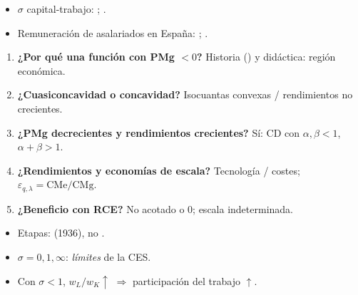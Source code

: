 \documentclass{article}
\begin{document}
\begin{columnas}
\anexorepaso
{}
\begin{itemize}
\item $\sigma$ capital-trabajo: ; .
\item Remuneración de asalariados en España: ; .
\end{itemize}
\begin{enumerate}
\item \textbf{¿Por qué una función con PMg $<0$?} Historia () y didáctica: región económica.
\item \textbf{¿Cuasiconcavidad o concavidad?} Isocuantas convexas / rendimientos no crecientes.
\item \textbf{¿PMg decrecientes y rendimientos crecientes?} Sí: CD con $\alpha,\beta<1$, $\alpha+\beta>1$.
\item \textbf{¿Rendimientos y economías de escala?} Tecnología / costes; $\varepsilon_{q,\lambda}=\mathrm{CMe}/\mathrm{CMg}$.
\item \textbf{¿Beneficio con RCE?} No acotado o 0; escala indeterminada.
\end{enumerate}
\begin{trampa}
\begin{itemize}
\item Etapas:  (1936), no .
\item $\sigma=0,1,\infty$: \emph{límites} de la CES.
\item Con $\sigma<1$, $w_L/w_K\uparrow$ $\Rightarrow$ participación del trabajo $\uparrow$.
\end{itemize}
\end{trampa}

\end{columnas}
\end{document}
